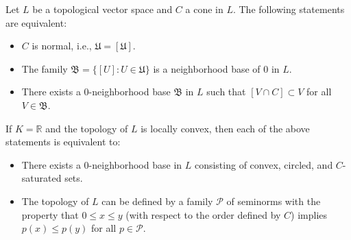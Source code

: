 Let $L$ be a topological vector space and $C$ a cone in $L$. The following statements are equivalent:

\begin{itemize}
\item[(a)] $C$ is normal, i.e., $\mathfrak{U} = [\mathfrak{U}]$.
\item[(b)] The family $\mathfrak{B} = \{[U] : U \in \mathfrak{U}\}$ is a neighborhood base of $0$ in $L$.
\item[(c)] There exists a $0$-neighborhood base $\mathfrak{B}$ in $L$ such that $[V \cap C] \subset V$ for all $V \in \mathfrak{B}$.
\end{itemize}

If $K = \mathbb{R}$ and the topology of $L$ is locally convex, then each of the above statements is equivalent to:

\begin{itemize}
\item[(d)] There exists a $0$-neighborhood base in $L$ consisting of convex, circled, and $C$-saturated sets.
\item[(e)] The topology of $L$ can be defined by a family $\mathcal{P}$ of seminorms with the property that $0 \leq x \leq y$ (with respect to the order defined by $C$) implies $p(x) \leq p(y)$ for all $p \in \mathcal{P}$.
\end{itemize}
